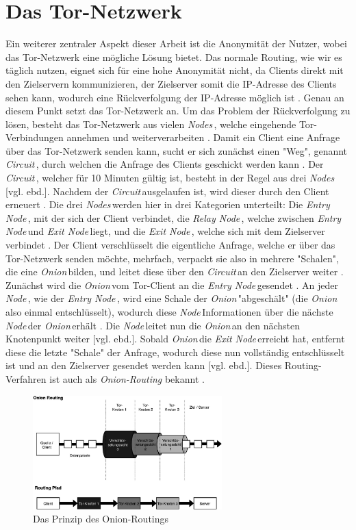 \documentclass[a4paper,ngerman, headheight=28pt,12pt]{scrartcl}
\newcommand{\vcite}[1]{\cite[vgl.][]{#1}}
\newcommand{\vebd}{[vgl. ebd.]}
\newcommand{\entryn}{\textit{Entry Node\,}}
\newcommand{\relayn}{\textit{Relay Node\,}}
\newcommand{\exitn}{\textit{Exit Node\,}}
\newcommand{\nodes}{\textit{Nodes\,}}
\newcommand{\node}{\textit{Node\,}}
\newcommand{\onion}{\textit{Onion\,}}
\newcommand{\circuit}{\textit{Circuit\,}}
\begin{document}
\section{Das Tor-Netzwerk}
Ein weiterer zentraler Aspekt dieser Arbeit ist die Anonymität der Nutzer, wobei das Tor-Netzwerk eine mögliche Lösung bietet. Das normale Routing, wie wir es täglich nutzen, eignet sich für eine hohe Anonymität nicht, da Clients direkt mit den Zielservern kommunizieren, der Zielserver somit die IP-Adresse des Clients sehen kann, wodurch eine Rückverfolgung der IP-Adresse möglich ist \vcite{TCP_IP,LocPolice}.
Genau an diesem Punkt setzt das Tor-Netzwerk an.
Um das Problem der Rückverfolgung zu lösen, besteht das Tor-Netzwerk aus vielen \nodes, welche eingehende Tor-Verbindungen annehmen und weiterverarbeiten \vcite{TorStructure}.
Damit ein Client eine Anfrage über das Tor-Netzwerk senden kann, sucht er sich zunächst einen "Weg", genannt \circuit, durch welchen die Anfrage des Clients geschickt werden kann \vcite{TorCircuits}.
Der \circuit, welcher für 10 Minuten gültig ist, besteht in der Regel aus drei \nodes \vebd. Nachdem der \circuit ausgelaufen ist, wird dieser durch den Client erneuert \vcite{FAQCircuitLifetime}.
Die drei \nodes werden hier in drei Kategorien unterteilt: Die \entryn, mit der sich der Client verbindet, die \relayn, welche zwischen \entryn und \exitn liegt, und die \exitn, welche sich mit dem Zielserver verbindet \vcite{TorStructure}. Der Client verschlüsselt die eigentliche Anfrage, welche er über das Tor-Netzwerk senden möchte, mehrfach, verpackt sie also in mehrere "Schalen", die eine \onion bilden, und leitet diese über den \circuit an den Zielserver weiter \vcite{TorFirstPub}.
Zunächst wird die \onion vom Tor-Client an die \entryn gesendet \vcite{TorStructure}. An jeder \node, wie der \entryn, wird eine Schale der \onion "abgeschält" (die \onion also einmal entschlüsselt), wodurch diese \node Informationen über die nächste \node der \onion erhält \vcite{TorFirstPub}. Die \node leitet nun die \onion an den nächsten Knotenpunkt weiter \vebd. Sobald \onion die \exitn erreicht hat, entfernt diese die letzte "Schale" der Anfrage, wodurch diese nun vollständig entschlüsselt ist und an den Zielserver gesendet werden kann \vebd. Dieses Routing-Verfahren ist auch als \textit{Onion-Routing} bekannt \vcite{TorStructure2}.
\begin{figure}[ht]
  \centering
  \includegraphics[width=0.65\textwidth]{TorRoutingSimple.png}
  \caption{Das Prinzip des Onion-Routings \vcite{fig:Tor-Structure} \label{fig:TorStructure}}
\end{figure} \\
\end{document}
